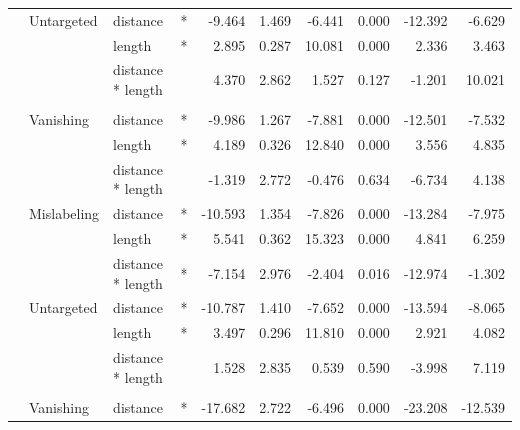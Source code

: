 \begin{longtable}[t]{llllrrrrrr}
\hspace{1em} & Untargeted & distance & * & -9.464 & 1.469 & -6.441 & 0.000 & -12.392 & -6.629\\
\cmidrule{3-10}\nopagebreak
\hspace{1em} &  & length & * & 2.895 & 0.287 & 10.081 & 0.000 & 2.336 & 3.463\\
\cmidrule{3-10}\nopagebreak
\hspace{1em} &  & distance * length &  & 4.370 & 2.862 & 1.527 & 0.127 & -1.201 & 10.021\\
\cmidrule{1-10}\pagebreak[0]
\addlinespace[0.3em]
\multicolumn{10}{l}{\textbf{SSD}}\\
\hspace{1em} & Vanishing & distance & * & -9.986 & 1.267 & -7.881 & 0.000 & -12.501 & -7.532\\
\cmidrule{3-10}\nopagebreak
\hspace{1em} &  & length & * & 4.189 & 0.326 & 12.840 & 0.000 & 3.556 & 4.835\\
\cmidrule{3-10}\nopagebreak
\hspace{1em} &  & distance * length &  & -1.319 & 2.772 & -0.476 & 0.634 & -6.734 & 4.138\\
\cmidrule{2-10}\nopagebreak
\hspace{1em} & Mislabeling & distance & * & -10.593 & 1.354 & -7.826 & 0.000 & -13.284 & -7.975\\
\cmidrule{3-10}\nopagebreak
\hspace{1em} &  & length & * & 5.541 & 0.362 & 15.323 & 0.000 & 4.841 & 6.259\\
\cmidrule{3-10}\nopagebreak
\hspace{1em} &  & distance * length & * & -7.154 & 2.976 & -2.404 & 0.016 & -12.974 & -1.302\\
\cmidrule{2-10}\nopagebreak
\hspace{1em} & Untargeted & distance & * & -10.787 & 1.410 & -7.652 & 0.000 & -13.594 & -8.065\\
\cmidrule{3-10}\nopagebreak
\hspace{1em} &  & length & * & 3.497 & 0.296 & 11.810 & 0.000 & 2.921 & 4.082\\
\cmidrule{3-10}\nopagebreak
\hspace{1em} &  & distance * length &  & 1.528 & 2.835 & 0.539 & 0.590 & -3.998 & 7.119\\
\cmidrule{1-10}\pagebreak[0]
\addlinespace[0.3em]
\multicolumn{10}{l}{\textbf{RetinaNet}}\\
\hspace{1em} & Vanishing & distance & * & -17.682 & 2.722 & -6.496 & 0.000 & -23.208 & -12.539\\

\end{longtable}
